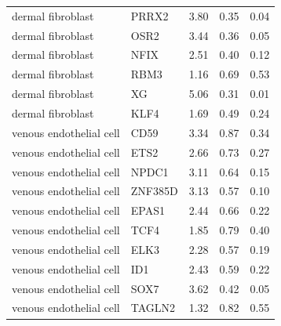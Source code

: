 \begin{longtable}{llccc}
dermal fibroblast & PRRX2 & 3.80 & 0.35 & 0.04 \\
dermal fibroblast & OSR2 & 3.44 & 0.36 & 0.05 \\
dermal fibroblast & NFIX & 2.51 & 0.40 & 0.12 \\
dermal fibroblast & RBM3 & 1.16 & 0.69 & 0.53 \\
dermal fibroblast & XG & 5.06 & 0.31 & 0.01 \\
dermal fibroblast & KLF4 & 1.69 & 0.49 & 0.24 \\
venous endothelial cell & CD59 & 3.34 & 0.87 & 0.34 \\
venous endothelial cell & ETS2 & 2.66 & 0.73 & 0.27 \\
venous endothelial cell & NPDC1 & 3.11 & 0.64 & 0.15 \\
venous endothelial cell & ZNF385D & 3.13 & 0.57 & 0.10 \\
venous endothelial cell & EPAS1 & 2.44 & 0.66 & 0.22 \\
venous endothelial cell & TCF4 & 1.85 & 0.79 & 0.40 \\
venous endothelial cell & ELK3 & 2.28 & 0.57 & 0.19 \\
venous endothelial cell & ID1 & 2.43 & 0.59 & 0.22 \\
venous endothelial cell & SOX7 & 3.62 & 0.42 & 0.05 \\
venous endothelial cell & TAGLN2 & 1.32 & 0.82 & 0.55 \\
\end{longtable}
